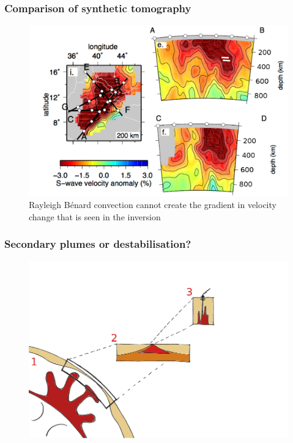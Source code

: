 \documentclass[aspectratio=169]{beamer}
\begin{document}
\begin{frame}
    \frametitle{Comparison of synthetic tomography}
    \begin{figure}
        \includegraphics[height=0.7\paperheight]{./figures/chiara1.png}
        \caption{Rayleigh B{\'e}nard convection cannot create the gradient in velocity change that is seen in the inversion}
    \end{figure}
\end{frame}

\begin{frame}
    \frametitle{Secondary plumes or destabilisation?}
    \begin{figure}
        \includegraphics[height=0.9\paperheight]{./pictures/drawing.png}
    \end{figure}
\end{frame}
\end{document}
